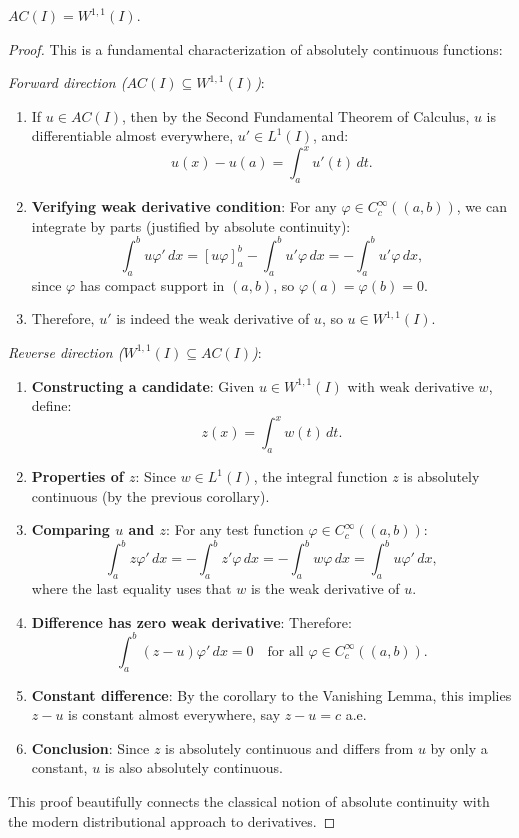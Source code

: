 \clearpage
\begin{theorem}
$AC(I) = W^{1,1}(I)$.
\end{theorem}

\begin{proof}
This is a fundamental characterization of absolutely continuous functions:

\textit{Forward direction ($AC(I) \subseteq W^{1,1}(I)$)}:
\begin{enumerate}
\item If $u \in AC(I)$, then by the Second Fundamental Theorem of Calculus, $u$ is differentiable almost everywhere, $u' \in L^1(I)$, and:
\[
u(x) - u(a) = \int_a^x u'(t) \, dt.
\]

\item \textbf{Verifying weak derivative condition}: For any $\varphi \in C_c^\infty((a,b))$, we can integrate by parts (justified by absolute continuity):
\[
\int_a^b u \varphi' \, dx = [u \varphi]_a^b - \int_a^b u' \varphi \, dx = -\int_a^b u' \varphi \, dx,
\]
since $\varphi$ has compact support in $(a,b)$, so $\varphi(a) = \varphi(b) = 0$.

\item Therefore, $u'$ is indeed the weak derivative of $u$, so $u \in W^{1,1}(I)$.
\end{enumerate}

\textit{Reverse direction ($W^{1,1}(I) \subseteq AC(I)$)}:
\begin{enumerate}
\item \textbf{Constructing a candidate}: Given $u \in W^{1,1}(I)$ with weak derivative $w$, define:
\[
z(x) = \int_a^x w(t) \, dt.
\]

\item \textbf{Properties of $z$}: Since $w \in L^1(I)$, the integral function $z$ is absolutely continuous (by the previous corollary).

\item \textbf{Comparing $u$ and $z$}: For any test function $\varphi \in C_c^\infty((a,b))$:
\[
\int_a^b z \varphi' \, dx = -\int_a^b z' \varphi \, dx = -\int_a^b w \varphi \, dx = \int_a^b u \varphi' \, dx,
\]
where the last equality uses that $w$ is the weak derivative of $u$.

\item \textbf{Difference has zero weak derivative}: Therefore:
\[
\int_a^b (z - u) \varphi' \, dx = 0 \quad \text{for all } \varphi \in C_c^\infty((a,b)).
\]

\item \textbf{Constant difference}: By the corollary to the Vanishing Lemma, this implies $z - u$ is constant almost everywhere, say $z - u = c$ a.e.

\item \textbf{Conclusion}: Since $z$ is absolutely continuous and differs from $u$ by only a constant, $u$ is also absolutely continuous.
\end{enumerate}

This proof beautifully connects the classical notion of absolute continuity with the modern distributional approach to derivatives.
\end{proof}

